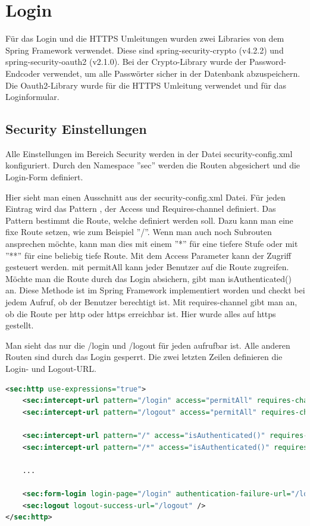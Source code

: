 \newpage

\section{Login}
Für das Login und die HTTPS Umleitungen wurden zwei Libraries von dem Spring Framework verwendet.
Diese sind spring-security-crypto (v4.2.2) und spring-security-oauth2 (v2.1.0). Bei der Crypto-Library wurde der Password-Endcoder verwendet, um alle Passwörter sicher in der Datenbank abzuspeichern. Die Oauth2-Library wurde für die HTTPS Umleitung verwendet und für das Loginformular.

\subsection{Security Einstellungen}
Alle Einstellungen im Bereich Security werden in der Datei security-config.xml konfiguriert. Durch den Namespace ''sec'' werden die Routen abgesichert und die Login-Form definiert.

Hier sieht man einen Ausschnitt aus der security-config.xml Datei. Für jeden Eintrag wird das Pattern , der Access und Requires-channel definiert. Das Pattern bestimmt die Route, welche definiert werden soll. Dazu kann man eine fixe Route setzen, wie zum Beispiel ''/''. Wenn man auch noch Subrouten ansprechen möchte, kann man dies mit einem ''*'' für eine tiefere Stufe oder mit ''**'' für eine beliebig tiefe Route. 
Mit dem Access Parameter kann der Zugriff gesteuert werden. mit permitAll kann jeder Benutzer auf die Route zugreifen. Möchte man die Route durch das Login absichern, gibt man isAuthenticated() an. Diese Methode ist im Spring Framework implementiert worden und checkt bei jedem Aufruf, ob der Benutzer berechtigt ist. Mit requires-channel gibt man an, ob die Route per http oder https erreichbar ist. Hier wurde alles auf https gestellt.

Man sieht das nur die /login und /logout für jeden aufrufbar ist. Alle anderen Routen sind durch das Login gesperrt. Die zwei letzten Zeilen definieren die Login- und Logout-URL.
\begin{lstlisting}[language=xml]
<sec:http use-expressions="true">
	<sec:intercept-url pattern="/login" access="permitAll" requires-channel="https"/>
	<sec:intercept-url pattern="/logout" access="permitAll" requires-channel="https"/>
	
	<sec:intercept-url pattern="/" access="isAuthenticated()" requires-channel="https" />
	<sec:intercept-url pattern="/*" access="isAuthenticated()" requires-channel="https" />
	
	...
		
	<sec:form-login login-page="/login" authentication-failure-url="/login?error=true" />
	<sec:logout logout-success-url="/logout" />
</sec:http>
\end{lstlisting}

